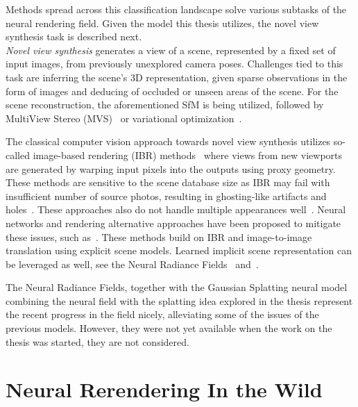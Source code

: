 Methods spread across this classification landscape solve various subtasks of the neural rendering field.
Given the model this thesis utilizes, the novel view synthesis task is described next.\\

\emph{Novel view synthesis} generates a view of a
scene, represented by a fixed set of input images, from previously unexplored camera poses. Challenges tied to this task are inferring the scene's 3D
representation, given sparse observations in the form of images and deducing of occluded
or unseen areas of the scene. For the scene reconstruction, the aforementioned SfM is being utilized, followed by
MultiView Stereo (MVS)~\cite{MVS1, MVS2} or variational optimization~\cite{VarOpt}.

The classical computer vision approach towards novel view synthesis utilizes so-called image-based rendering (IBR)
methods~\citep{IBR1, IBR2, IBR3, IBR4} where views from new viewports are generated by warping input pixels into the
outputs using proxy geometry. These methods are sensitive to the scene database size as IBR may fail with insufficient number of source photos, resulting in ghosting-like artifacts and holes~\citep{SOTARendering}. These approaches
also do not handle multiple appearances well~\citep{NRIW}. Neural networks and
rendering alternative approaches have been proposed to mitigate these issues, such as~\citet{NR1, NR2, NRIW, InvSfM, FVS, SVS}.
These methods build on IBR and image-to-image translation using explicit scene models. Learned implicit
scene representation can be leveraged as well, see the Neural Radiance Fields~\citet{NERF, NERF2}
and~\citet{SceneRepr}.

The Neural Radiance Fields, together with the Gaussian Splatting neural model~\citep{kerbl3Dgaussians}
combining the neural field with the splatting idea explored in the thesis represent the recent progress
in the field nicely, alleviating some of the issues of the previous models. However, they were not yet
available when the work on the thesis was started, they are not considered.


\section{Neural Rerendering In the Wild}

